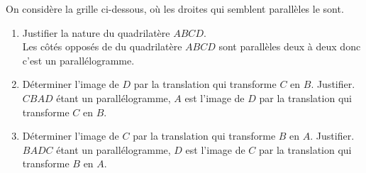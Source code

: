 \begin{corrige}
    On considère la grille ci-dessous, où les droites qui semblent parallèles le sont.

    \scalebox{0.7}{
    \Reseau[%
        Colonnes=5,%
        Lignes=8,%
        Traces={%
            pair A,B,C,D,E,F,G,H; %
            A=ppreseau(0,8);
            B=ppreseau(1,8);
            C=ppreseau(1,7);
            D=ppreseau(0,7);
            E=ppreseau(2,5);
            F=ppreseau(1,2);
            G=ppreseau(3,2);
            H=ppreseau(4,6);
            marque_p:="croix";
            drawoptions(withcolor red);
            pointe(A,B,C,D,E,F,G,H);
            label.urt(btex $A$ etex,A);
            label.urt(btex $B$ etex,B);
            label.urt(btex $C$ etex,C);
            label.urt(btex $D$ etex,D);
            label.urt(btex $E$ etex,E);
            label.urt(btex $F$ etex,F);
            label.urt(btex $G$ etex,G);
            label.urt(btex $H$ etex,H);
            drawoptions();
        }]{}
    }
    
    \begin{enumerate}
        \item Justifier la nature du quadrilatère $ABCD$.\\
        {\red Les côtés opposés de du quadrilatère $ABCD$ sont parallèles deux à deux donc c'est un parallélogramme.}        
        \item Déterminer l'image de $D$ par la translation qui transforme $C$ en $B$. Justifier.\\
        {\red $CBAD$ étant un parallélogramme, $A$ est l'image de $D$ par la translation qui transforme $C$ en $B$.}
        \item Déterminer l'image de $C$ par la translation qui transforme $B$ en $A$. Justifier.\\
        {\red $BADC$ étant un parallélogramme, $D$ est l'image de $C$ par la translation qui transforme $B$ en $A$.}
    \end{enumerate}
\end{corrige}

